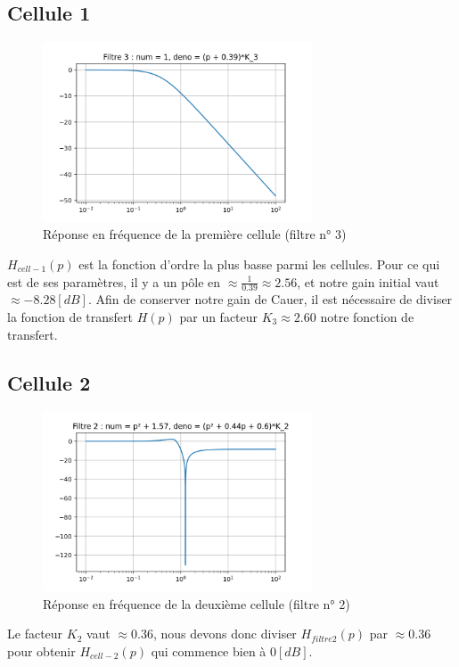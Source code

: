 \documentclass[a4paper,12pt,oneside]{report}	%
\begin{document}
        \subsection{Cellule 1}
            \begin{figure}[h!]
                \centering
                \includegraphics[width = 8cm]{images/2.0.4 - Filtre 3.png}
                \caption{Réponse en fréquence de la première cellule (filtre n° 3)}
                \label{fig:repfreq-filtre-3}
            \end{figure}
            $H_{cell-1}(p)$ est la fonction d'ordre la plus basse parmi les cellules. Pour ce qui est de ses paramètres, il y a un pôle en $\approx \frac{1}{0.39} \approx 2.56$, et notre gain initial vaut $\approx -8.28 [dB]$. Afin de conserver notre gain de Cauer, il est nécessaire de diviser la fonction de transfert $H(p)$ par un facteur $K_3 \approx 2.60$ notre fonction de transfert.
        \subsection{Cellule 2}
            \begin{figure}[h!]
                \centering
                \includegraphics[width = 8cm]{images/2.0.4 - Filtre 2.png}
                \caption{Réponse en fréquence de la deuxième cellule (filtre n° 2)}
                \label{fig:repfreq-filtre-2}
            \end{figure}
            Le facteur $K_2$ vaut $\approx 0.36$, nous devons donc diviser $H_{filtre 2}(p)$ par $\approx 0.36$ pour obtenir $H_{cell-2}(p)$ qui commence bien à $0 [dB]$.
            
\end{document}
